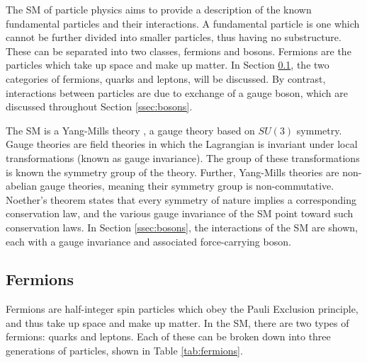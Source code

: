         The \gls{SM} of particle physics aims to provide a description of the known fundamental particles and their interactions. A fundamental particle is one which cannot be further divided into smaller particles, thus having no substructure. These can be separated into two classes, fermions and bosons. Fermions are the particles which take up space and make up matter. In Section \ref{ssec:fermions}, the two categories of fermions, quarks and leptons, will be discussed. By contrast, interactions between particles are due to exchange of a gauge boson, which are discussed throughout Section \ref{ssec:bosons}.

        The \gls{SM} is a Yang-Mills theory \cite{yang-mills}, a gauge theory based on $SU(3)$ symmetry. Gauge theories are field theories in which the Lagrangian is invariant under local transformations (known as gauge invariance). The group of these transformations is known the symmetry group of the theory. Further, Yang-Mills theories are non-abelian gauge theories, meaning their symmetry group is non-commutative. Noether's theorem \cite{noether} states that every symmetry of nature implies a corresponding conservation law, and the various gauge invariance of the \gls{SM} point toward such conservation laws. In Section \ref{ssec:bosons}, the interactions of the \gls{SM} are shown, each with a gauge invariance and associated force-carrying boson.


        \subsection{Fermions} \label{ssec:fermions}
        Fermions are half-integer spin particles which obey the Pauli Exclusion principle, and thus take up space and make up matter. In the \gls{SM}, there are two types of fermions: quarks and leptons. Each of these can be broken down into three generations of particles, shown in Table \ref{tab:fermions}.

